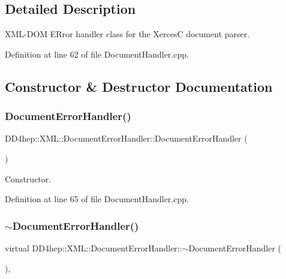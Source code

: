 \subsection{Detailed Description}
X\+M\+L-\/\+D\+OM E\+Rror handler class for the XercesC document parser. 

Definition at line 62 of file Document\+Handler.\+cpp.



\subsection{Constructor \& Destructor Documentation}
\hypertarget{class_d_d4hep_1_1_x_m_l_1_1_document_error_handler_aa887197fc5ae8d3a7463307a36dad8b2}{}\label{class_d_d4hep_1_1_x_m_l_1_1_document_error_handler_aa887197fc5ae8d3a7463307a36dad8b2} 
\subsubsection{\texorpdfstring{Document\+Error\+Handler()}{DocumentErrorHandler()}}
{\footnotesize\ttfamily D\+D4hep\+::\+X\+M\+L\+::\+Document\+Error\+Handler\+::\+Document\+Error\+Handler (\begin{DoxyParamCaption}{ }\end{DoxyParamCaption})\hspace{0.3cm}{\ttfamily [inline]}}



Constructor. 



Definition at line 65 of file Document\+Handler.\+cpp.

\hypertarget{class_d_d4hep_1_1_x_m_l_1_1_document_error_handler_a2444e9636a7fe532b865aab9e7b3c676}{}\label{class_d_d4hep_1_1_x_m_l_1_1_document_error_handler_a2444e9636a7fe532b865aab9e7b3c676} 
\subsubsection{\texorpdfstring{$\sim$\+Document\+Error\+Handler()}{~DocumentErrorHandler()}}
{\footnotesize\ttfamily virtual D\+D4hep\+::\+X\+M\+L\+::\+Document\+Error\+Handler\+::$\sim$\+Document\+Error\+Handler (\begin{DoxyParamCaption}{ }\end{DoxyParamCaption})\hspace{0.3cm}{\ttfamily [inline]}, {\ttfamily [virtual]}}




